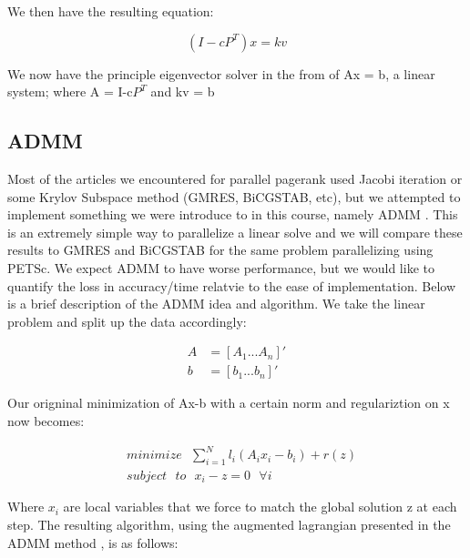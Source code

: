 \documentclass[a4paper,10pt]{article}
\begin{document}
We then have the resulting equation:

\begin{center}
\begin{equation}
  (I-cP^{T})x = kv
\end{equation}
\end{center}
We now have the principle eigenvector solver in the from of Ax = b, a linear system; where A = I-c$P^{T}$ and kv = b



\subsection{ADMM}

Most of the articles we encountered for parallel pagerank used Jacobi iteration or some Krylov Subspace method (GMRES, BiCGSTAB, etc), but we attempted to implement something we were introduce to in this course, namely ADMM \cite{ADMM}. This is an extremely simple way to parallelize a linear solve and we will compare these results to GMRES and BiCGSTAB for the same problem parallelizing using PETSc. We expect ADMM to have worse performance, but we would like to quantify the loss in accuracy/time relatvie to the ease of implementation.
\newline
\linebreak
Below is a brief description of the ADMM idea and algorithm.
\newline
We take the linear problem and split up the data accordingly:
\begin{center}
\begin{align}
	A &= \left[ A_{1} ... A_{n} \right]' \\
	b &= \left[ b_{1} ... b_{n} \right]' 
\end{align}
\end{center}
Our origninal minimization of Ax-b with a certain norm and regulariztion on x now becomes:

\begin{center}
\begin{align}
	&minimize \: \: \: \sum_{i=1}^{N} l_{i}(A_{i}x_{i} - b_{i}) + r(z) \\
	&subject \: \: \: to \: \: \: x_{i} - z = 0 \: \: \: \forall i
\end{align}
\end{center}
Where $x_{i}$ are local variables that we force to match the global solution z at each step.
\newline
The resulting algorithm, using the augmented lagrangian presented in the ADMM method \cite{ADMM}, is as follows:
\end{document}
